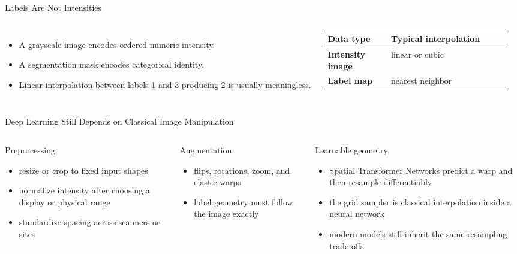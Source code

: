\documentclass[aspectratio=169,10pt]{beamer}
\begin{document}
\begin{frame}{Labels Are Not Intensities}
\begin{columns}[T,onlytextwidth]
\begin{itemize}
\item A grayscale image encodes ordered numeric intensity.
\item A segmentation mask encodes categorical identity.
\item Linear interpolation between labels 1 and 3 producing 2 is usually meaningless.
\end{itemize}

\small
\begin{tabularx}{\linewidth}{>{\bfseries}p{0.35\linewidth} X}
\toprule
Data type & Typical interpolation \\
\midrule
Intensity image & linear or cubic \\
Label map & nearest neighbor \\
\bottomrule
\end{tabularx}
\end{columns}
\end{frame}



\begin{frame}{Deep Learning Still Depends on Classical Image Manipulation}
\begin{columns}[T,onlytextwidth]
\begin{block}{Preprocessing}
\begin{itemize}
\item resize or crop to fixed input shapes
\item normalize intensity after choosing a display or physical range
\item standardize spacing across scanners or sites
\end{itemize}
\end{block}

\begin{block}{Augmentation}
\begin{itemize}
\item flips, rotations, zoom, and elastic warps
\item label geometry must follow the image exactly
\end{itemize}
\end{block}

\begin{block}{Learnable geometry}
\begin{itemize}
\item Spatial Transformer Networks predict a warp and then resample differentiably
\item the grid sampler is classical interpolation inside a neural network
\item modern models still inherit the same resampling trade-offs
\end{itemize}
\end{block}
\end{columns}
\end{frame}
\end{document}
